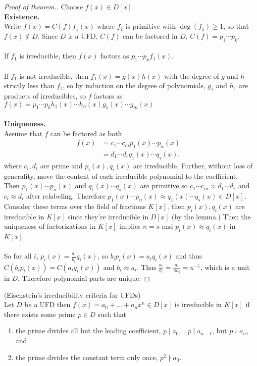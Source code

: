 \documentclass{article}
\newenvironment{theorem}[1][Theorem.]{
  \begin{trivlist} \item[\hskip \labelsep {\bfseries #1}]
}{\end{trivlist}}
\begin{document}
\begin{proof}[Proof of theorem.]
  Choose $f(x) \in D[x]$. \\
  \textbf{Existence.} \\
  Write $f(x) = C(f)f_1(x)$ where $f_1$ is primitive with $\deg(f_1) \geq 1$,
  so that $f(x) \not\in D$. Since $D$ is a UFD, $C(f)$ can be factored in $D$,
  $C(f) = p_1\cdots p_k$.
  \\~\\
  If $f_1$ is irreducible, then $f(x)$ factors as $p_1\cdots p_k f_1(x)$.
  \\~\\
  If $f_1$ is not irreducible, then $f_1(x) = g(x)h(x)$ with the degree of
  $g$ and $h$ strictly less than $f_1$, so by induction on the degree of
  polynomials, $g_1$ and $h_1$ are products of irreducibles, so $f$ factors as
  $f(x) = p_1 \cdots p_k h_1(x) \cdots h_n(x) g_1(x) \cdots g_m(x)$
  \\~\\
  \textbf{Uniqueness.} \\
  Assume that $f$ can be factored as both \begin{align*}
    f(x) &= c_1 \cdots c_m p_1(x) \cdots p_n(x) \\
    &= d_1 \cdots d_r q_1(x) \cdots q_s(x),
  \end{align*} where $c_i, d_i$ are prime and $p_i(x), q_i(x)$ are irreducible.
  Further, without loss of generality, move the content of each irreducible
  polynomial to the coefficient. Then
  $p_1(x) \cdots p_n(x)$ and $q_1(x) \cdots q_s(x)$ are primitive so
  $c_1 \cdots c_m \approx d_1 \cdots d_r$ and $c_i \approx d_i$ after
  relabeling. Therefore
  $p_1(x) \cdots p_n(x) \approx q_1(x) \cdots q_s(x) \in D[x]$.
  Consider these terms over the field of fractions $K[x]$, then $p_i(x), q_i(x)$
  are irreducible in $K[x]$ since they're irreducible in $D[x]$ (by the lemma.)
  Then the uniqueness of factorizations in $K[x]$ implies $n=s$ and
  $p_i(x) \approx q_i(x)$ in $K[x]$.
  \\~\\
  So for all $i$, $p_i(x) = \frac{a_i}{b_i}q_i(x)$, so
  $b_i p_i(x) = a_i q_i(x)$ and thus $C(b_i p_i(x)) = C(a_i q_i(x))$ and
  $b_i \approx a_i$. Thus $\frac{a_i}{b_i} = \frac{a_i}{u a_i} = u^{-1}$, which
  is a unit in $D$. Therefore polynomial parts are unique.
\end{proof}
\begin{theorem} (Eisenstein's irreducibility criteria for UFDs) \\
  Let $D$ be a UFD then $f(x) = a_0 + \hdots + a_n x^n \in D[x]$ is irreducible
  in $K[x]$ if there exists some prime $p \in D$ such that
  \begin{enumerate}
    \item the prime divides all but the leading coefficient,
    $p \mid a_0, \hdots p \mid a_{n-1}$, but $p \nmid a_n$, and
    \item the prime divides the constant term only once, $p^2 \nmid a_0$.
  \end{enumerate}
\end{theorem}
\end{document}
